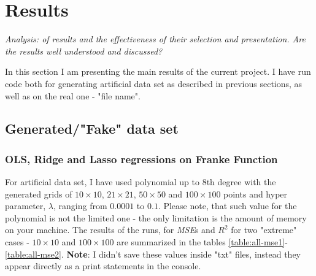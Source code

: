 \section{Results}
\label{results}

\textit{Analysis: of results and the effectiveness of their selection and presentation. Are the results well understood and discussed?}

In this section I am presenting the main results of the current project. I have run code both for generating artificial data set as described in previous sections, as well as on the real one - "file name". 

\subsection{Generated/"Fake" data set}
\subsubsection{OLS, Ridge and Lasso regressions on Franke Function}
For artificial data set, I have used polynomial up to 8th degree with the generated grids of $10\times10$, $21\times21$, $50\times50$ and $100\times100$ points and hyper parameter, $\lambda$, ranging from $0.0001$ to $0.1$. Please note, that such value for the polynomial is not the limited one - the only limitation is the amount of memory on your machine. The results of the runs, for \textit{MSE}s and $R^2$  for two "extreme" cases - $10\times10$ and $100\times100$ are summarized in the tables \ref{table:all-mse1}-\ref{table:all-mse2}. \textbf{Note}: I didn't save these values inside "txt" files, instead they appear directly as a print statements in the console.

